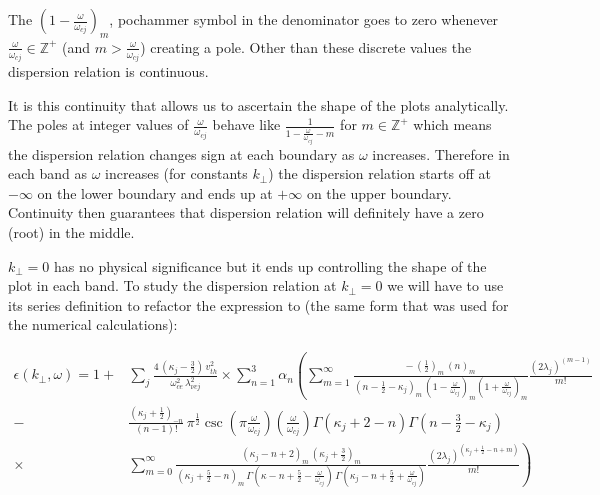 \documentclass[12pt,a4paper]{article}
\begin{document}

    The $(1 - \frac{\omega}{\omega_{cj}})_m$, pochammer symbol in the denominator goes to zero whenever $\frac{\omega}{\omega_{cj}} \in \mathbb{Z}^+$ (and $m > \frac{\omega}{\omega_{cj}}$) creating a pole.
    Other than these discrete values the dispersion relation is continuous.


    It is this continuity that allows us to ascertain the shape of the plots analytically. The poles at integer values of $\frac{\omega}{\omega_{cj}}$ behave like $\frac{1}{1 - \frac{\omega}{\omega_{cj}} - m}$ for $m \in \mathbb{Z}^+$ which means the dispersion relation changes sign at each boundary as $\omega$ increases. Therefore in each band as $\omega$ increases (for constants $k_\perp$) the dispersion relation starts off at $-\infty$ on the lower boundary and ends up at $+\infty$ on the upper boundary. Continuity then guarantees that dispersion relation will definitely have a zero (root) in the middle.

    $k_\perp = 0$ has no physical significance but it ends up controlling the shape of the plot in each band. To study the dispersion relation at $k_\perp = 0$ we will have to use its series definition to refactor the expression to (the same form that was used for the numerical calculations):

    \begin{align}
        \epsilon(k_\perp, \omega) = 1 +& \sum_j \frac{4 \, (\kappa_j - \frac{3}{2}) \, v^2_{th}}{\omega^2_{ce} \, \lambda^2_{\nu c j}} \times \sum_{n = 1}^3 \alpha_n \left( \sum_{m = 1}^\infty \frac{ -\, (\frac{1}{2})_m \, (n)_m }{(n - \frac{1}{2} - \kappa_j)_m \, (1 - \frac{\omega}{\omega_{cj}})_m (1 + \frac{\omega}{\omega_{cj}})_m } \frac{(2 \lambda_j)^{(m - 1)}}{m!} \right. \\
        -& \left. \frac{(\kappa_j + \frac{1}{2})_{-n}}{(n - 1)!} \, \pi^{\frac{1}{2}} \csc\left(\pi \frac{\omega}{\omega_{cj}}\right) \left(\frac{\omega}{\omega_{cj}}\right) \Gamma(\kappa_j + 2 - n) \Gamma(n - \frac{3}{2} - \kappa_j) \right.\\
        \times& \left. \sum_{m = 0}^\infty \frac{(\kappa_j - n + 2)_m \, (\kappa_j + \frac{3}{2})_m}{(\kappa_j + \frac{5}{2} - n)_m \, \Gamma(\kappa - n + \frac{5}{2} - \frac{\omega}{\omega_{cj}}) \, \Gamma(\kappa_j - n + \frac{5}{2} + \frac{\omega}{\omega_{cj}})} \frac{(2 \lambda_j)^{(\kappa_j + \frac{1}{2} - n + m)}}{m!} \right)
    \end{align}
\end{document}
